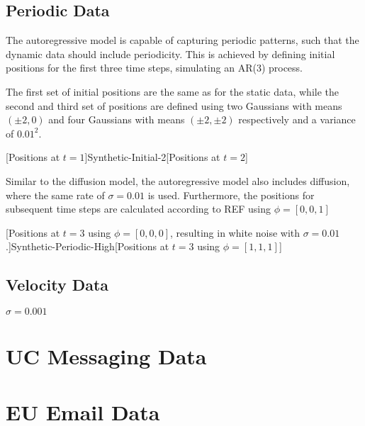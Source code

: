     \subsection{Periodic Data}
    
        The autoregressive model is capable of capturing periodic patterns, such that the dynamic data should include periodicity. This is achieved by defining initial positions for the first three time steps, simulating an AR(3) process. 
        
        The first set of initial positions are the same as for the static data, while the second and third set of positions are defined using two Gaussians with means $(\pm2,0)$ and four Gaussians with means $(\pm2,\pm2)$ respectively and a variance of $0.01^2$.
       
        [Positions at $t=1$]{Synthetic-Initial-2}[Positions at $t=2$]
        
        Similar to the diffusion model, the autoregressive model also includes diffusion, where the same rate of $\sigma=0.01$ is used. Furthermore, the positions for subsequent time steps are calculated according to REF using $\phi=[0, 0, 1]$
        
        
        
        
        
        [Positions at $t=3$ using $\phi=[0,0,0]$, resulting in white noise with $\sigma=0.01$.]{Synthetic-Periodic-High}[Positions at $t=3$ using $\phi=[1,1,1]$]
        
    \subsection{Velocity Data}
    
        $\sigma=0.001$
        
\section{UC Messaging Data}

    
\section{EU Email Data}

